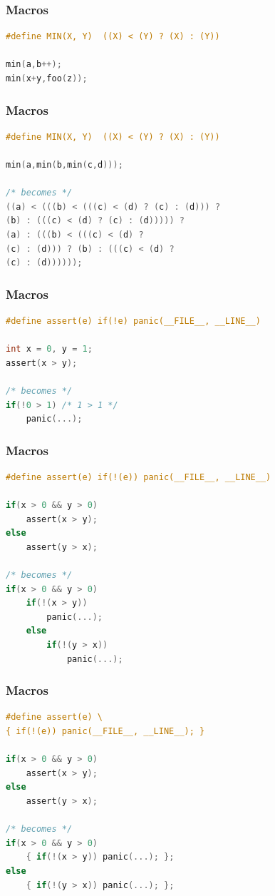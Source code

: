 \documentclass[12pt,compress]{beamer}
\begin{document}
\begin{frame}[fragile]
\frametitle{Macros}

\begin{lstlisting}[language=C,basicstyle=\ttfamily,keywordstyle=\color{red}]
#define MIN(X, Y)  ((X) < (Y) ? (X) : (Y))

min(a,b++);
min(x+y,foo(z));
\end{lstlisting}
\end{frame}

\begin{frame}[fragile]
\frametitle{Macros}

\begin{lstlisting}[language=C,basicstyle=\ttfamily,keywordstyle=\color{red}]
#define MIN(X, Y)  ((X) < (Y) ? (X) : (Y))

min(a,min(b,min(c,d)));

/* becomes */
((a) < (((b) < (((c) < (d) ? (c) : (d))) ?
(b) : (((c) < (d) ? (c) : (d))))) ?
(a) : (((b) < (((c) < (d) ?
(c) : (d))) ? (b) : (((c) < (d) ?
(c) : (d))))));
\end{lstlisting}
\end{frame}

\begin{frame}[fragile]
\frametitle{Macros}

\begin{lstlisting}[language=C,basicstyle=\ttfamily\small,keywordstyle=\color{red}]
#define assert(e) if(!e) panic(__FILE__, __LINE__)

int x = 0, y = 1;
assert(x > y);

/* becomes */
if(!0 > 1) /* 1 > 1 */
    panic(...);
\end{lstlisting}
\end{frame}


\begin{frame}[fragile]
\frametitle{Macros}

\begin{lstlisting}[language=C,basicstyle=\ttfamily\small,keywordstyle=\color{red}]
#define assert(e) if(!(e)) panic(__FILE__, __LINE__)

if(x > 0 && y > 0)
    assert(x > y);
else
    assert(y > x);

/* becomes */
if(x > 0 && y > 0)
    if(!(x > y))
        panic(...);
    else
        if(!(y > x))
            panic(...);
\end{lstlisting}
\end{frame}


\begin{frame}[fragile]
\frametitle{Macros}

\begin{lstlisting}[language=C,basicstyle=\ttfamily\small,keywordstyle=\color{red}]
#define assert(e) \
{ if(!(e)) panic(__FILE__, __LINE__); }

if(x > 0 && y > 0)
    assert(x > y);
else
    assert(y > x);

/* becomes */
if(x > 0 && y > 0)
    { if(!(x > y)) panic(...); };
else
    { if(!(y > x)) panic(...); };
\end{lstlisting}
\end{frame}
\end{document}

